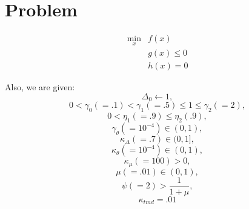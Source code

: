 \documentclass{article}
\begin{document}
\section{Problem}
\begin{align*} 
\min_x & f(x) \\
 & g(x) \le 0 \\
 & h(x) = 0
\end{align*}

Also, we are given:
\[ \Delta_0 \gets 1,						\]
\[ 0 < \gamma_0 (=.1)< \gamma_1 (=.5)\le 1 \le \gamma_2(=2),	\]
\[ 0 < \eta_1 (=.9)\le \eta_2(.9),				\]
\[ \gamma_{\theta} (=10^{-4})\in (0, 1),			\]
\[ \kappa_{\Delta} (=.7) \in (0, 1],				\]
\[ \kappa_{\theta}(=10^{-4}) \in (0,1),				\]
\[ \kappa_{\mu} (=100) > 0,					\]
\[ \mu (=.01)\in (0,1),						\]
\[ \psi (=2)> \frac 1 {1+\mu},					\]
\[ \kappa_{tmd}=.01 						\]

\newpage
\end{document}
